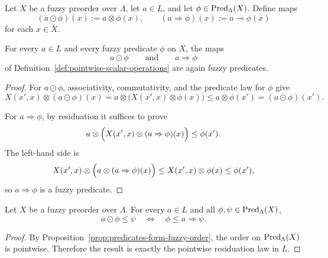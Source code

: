 \begin{definition}
\label{def:pointwise-scalar-operations}
    Let \(X\) be a fuzzy preorder over \(\Lambda\), let \(a\in L\), and let \(\phi\in \mathrm{Pred}_\Lambda(X)\). Define maps
    \[
        (a\odot \phi)(x):=a\otimes \phi(x),
        \qquad
        (a\Rightarrow \phi)(x):=a\multimap \phi(x)
    \]
    for each \(x\in X\).
\end{definition}

\begin{proposition}
\label{prop:scalar-operations-preserve-predicates}
    For every \(a\in L\) and every fuzzy predicate \(\phi\) on \(X\), the maps
    \[
        a\odot \phi
        \qquad\text{and}\qquad
        a\Rightarrow \phi
    \]
    of Definition~\ref{def:pointwise-scalar-operations} are again fuzzy predicates.
\end{proposition}

\begin{proof}
    For \(a\odot \phi\), associativity, commutativity, and the predicate law for \(\phi\) give
    \[
        X(x',x)\otimes (a\odot \phi)(x)
        =
        a\otimes \bigl(X(x',x)\otimes \phi(x)\bigr)
        \leq
        a\otimes \phi(x')
        =
        (a\odot \phi)(x').
    \]

    For \(a\Rightarrow \phi\), by residuation it suffices to prove
    \[
        a\otimes
        \Bigl(X(x',x)\otimes (a\Rightarrow \phi)(x)\Bigr)
        \leq
        \phi(x').
    \]
    The left-hand side is
    \[
        X(x',x)\otimes
        \Bigl(a\otimes (a\Rightarrow \phi)(x)\Bigr)
        \leq
        X(x',x)\otimes\phi(x)
        \leq
        \phi(x'),
    \]
    so \(a\Rightarrow\phi\) is a fuzzy predicate.
\end{proof}

\begin{proposition}
\label{prop:scalar-adjunction}
    Let \(X\) be a fuzzy preorder over \(\Lambda\). For every \(a\in L\) and all \(\phi,\psi\in \mathrm{Pred}_\Lambda(X)\),
    \[
        a\odot \phi\leq \psi
        \quad\Longleftrightarrow\quad
        \phi\leq a\Rightarrow \psi.
    \]
\end{proposition}

\begin{proof}
    By Proposition~\ref{prop:predicates-form-fuzzy-order}, the order on \(\mathrm{Pred}_\Lambda(X)\) is pointwise. Therefore the result is exactly the pointwise residuation law in \(L\).
\end{proof}

